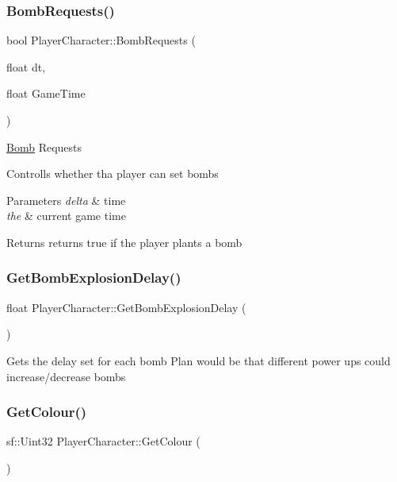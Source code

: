 \subsubsection{\texorpdfstring{Bomb\+Requests()}{BombRequests()}}
{\footnotesize\ttfamily bool Player\+Character\+::\+Bomb\+Requests (\begin{DoxyParamCaption}\item[{float}]{dt,  }\item[{float}]{Game\+Time }\end{DoxyParamCaption})}

\hyperlink{class_bomb}{Bomb} Requests

Controlls whether tha player can set bombs


\begin{DoxyParams}{Parameters}
{\em delta} & time \\
\hline
{\em the} & current game time \\
\hline
\end{DoxyParams}
\begin{DoxyReturn}{Returns}
returns true if the player plants a bomb 
\end{DoxyReturn}
\hypertarget{class_player_character_a116a731d0dd7788b0e8b8100cd97928a}{}\label{class_player_character_a116a731d0dd7788b0e8b8100cd97928a} 
\subsubsection{\texorpdfstring{Get\+Bomb\+Explosion\+Delay()}{GetBombExplosionDelay()}}
{\footnotesize\ttfamily float Player\+Character\+::\+Get\+Bomb\+Explosion\+Delay (\begin{DoxyParamCaption}{ }\end{DoxyParamCaption})\hspace{0.3cm}{\ttfamily [inline]}}

Gets the delay set for each bomb Plan would be that different power ups could increase/decrease bombs \hypertarget{class_player_character_a0c4259c1a2eec6c1669bf9ce9ff4a646}{}\label{class_player_character_a0c4259c1a2eec6c1669bf9ce9ff4a646} 
\subsubsection{\texorpdfstring{Get\+Colour()}{GetColour()}}
{\footnotesize\ttfamily sf\+::\+Uint32 Player\+Character\+::\+Get\+Colour (\begin{DoxyParamCaption}{ }\end{DoxyParamCaption})\hspace{0.3cm}{\ttfamily [inline]}}

